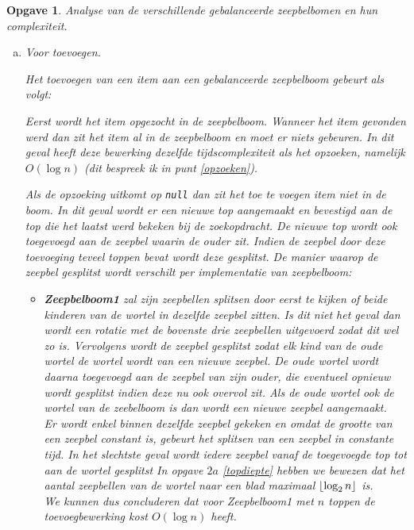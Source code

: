 \documentclass[12pt,hidelinks]{article}
\DeclarePairedDelimiter\floor{\lfloor}{\rfloor}
\newtheorem{opgave}{Opgave}
\newcommand{\newln}{~\\\vspace{0.5em}}
\begin{document}
    \begin{opgave}
        Analyse van de verschillende gebalanceerde zeepbelbomen en hun complexiteit.
        \begin{enumerate}[a.]
            \item Voor toevoegen.

                \normalfont
                Het toevoegen van een item aan een gebalanceerde zeepbelboom gebeurt als volgt:

                Eerst wordt het item opgezocht in de zeepbelboom.
                Wanneer het item gevonden werd dan zit het item al in de zeepbelboom en moet er niets gebeuren.
                In dit geval heeft deze bewerking dezelfde tijdscomplexiteit als het opzoeken, namelijk $O(\log n)$ (dit bespreek ik in punt \ref{opzoeken}).

                Als de opzoeking uitkomt op {\tt null} dan zit het toe te voegen item niet in de boom.
                In dit geval wordt er een nieuwe top aangemaakt en bevestigd aan de top die het laatst werd bekeken bij de zoekopdracht.
                De nieuwe top wordt ook toegevoegd aan de zeepbel waarin de ouder zit.
                Indien de zeepbel door deze toevoeging teveel toppen bevat wordt deze gesplitst.
                De manier waarop de zeepbel gesplitst wordt verschilt per implementatie van zeepbelboom:
                \begin{itemize}
                    \item \textbf{Zeepbelboom1} zal zijn zeepbellen splitsen door eerst te kijken of beide kinderen van de wortel in dezelfde zeepbel zitten.
                        Is dit niet het geval dan wordt een rotatie met de bovenste drie zeepbellen uitgevoerd zodat dit wel zo is.
                        Vervolgens wordt de zeepbel gesplitst zodat elk kind van de oude wortel de wortel wordt van een nieuwe zeepbel.
                        De oude wortel wordt daarna toegevoegd aan de zeepbel van zijn ouder, die eventueel opnieuw wordt gesplitst indien deze nu ook overvol zit.
                        Als de oude wortel ook de wortel van de zeebelboom is dan wordt een nieuwe zeepbel aangemaakt.
                        \newln
                        Er wordt enkel binnen dezelfde zeepbel gekeken en omdat de grootte van een zeepbel constant is, gebeurt het splitsen van een zeepbel in constante tijd.
                        In het slechtste geval wordt iedere zeepbel vanaf de toegevoegde top tot aan de wortel gesplitst
                        In opgave $2a$ \eqref{topdiepte} hebben we bewezen dat het aantal zeepbellen van de wortel naar een blad maximaal $\floor{\log_2 n}$ is.
                        \newln
                        We kunnen dus concluderen dat voor Zeepbelboom1 met $n$ toppen de toevoegbewerking kost $O(\log n)$ heeft.


\end{itemize}
\end{enumerate}
\end{opgave}
\end{document}
